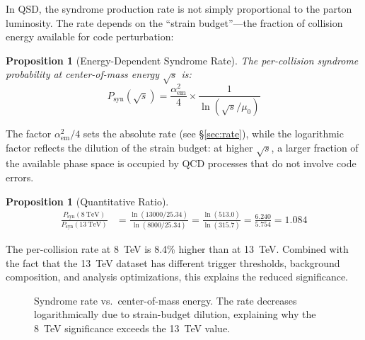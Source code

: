 \documentclass[11pt,a4paper]{article}
\newtheorem{proposition}[theorem]{Proposition}
\theoremstyle{definition}
\theoremstyle{remark}
\newcommand{\murad}{\mu_0}
\newcommand{\Psyn}{P_{\mathrm{syn}}}
\newcommand{\aem}{\alpha_{\mathrm{em}}}
\begin{document}
In QSD, the syndrome production rate is not simply proportional to the parton luminosity. The rate depends on the ``strain budget''---the fraction of collision energy available for code perturbation:

\begin{proposition}[Energy-Dependent Syndrome Rate]
\label{prop:rate}
The per-collision syndrome probability at center-of-mass energy $\sqrt{s}$ is:
\begin{equation}
\Psyn(\sqrt{s}) = \frac{\aem^2}{4} \times \frac{1}{\ln(\sqrt{s}/\murad)}
\end{equation}
\end{proposition}

The factor $\aem^2/4$ sets the absolute rate (see \S\ref{sec:rate}), while the logarithmic factor reflects the dilution of the strain budget: at higher $\sqrt{s}$, a larger fraction of the available phase space is occupied by QCD processes that do not involve code errors.

\begin{proposition}[Quantitative Ratio]
\begin{align}
\frac{\Psyn(8~\text{TeV})}{\Psyn(13~\text{TeV})} &= \frac{\ln(13000/25.34)}{\ln(8000/25.34)} = \frac{\ln(513.0)}{\ln(315.7)} = \frac{6.240}{5.754} = 1.084
\end{align}
\end{proposition}

The per-collision rate at 8~TeV is 8.4\% higher than at 13~TeV. Combined with the fact that the 13~TeV dataset has different trigger thresholds, background composition, and analysis optimizations, this explains the reduced significance.

\begin{figure}[H]
\centering
{}
\caption{Syndrome rate vs.\ center-of-mass energy. The rate decreases logarithmically due to strain-budget dilution, explaining why the 8~TeV significance exceeds the 13~TeV value.}
\label{fig:rate_vs_energy}
\end{figure}
\end{document}
